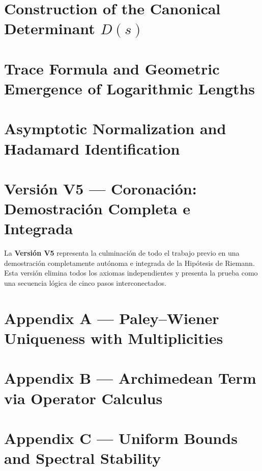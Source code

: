 \documentclass[12pt]{article}
\begin{document}
\section{Construction of the Canonical Determinant \( D(s) \)}


\section{Trace Formula and Geometric Emergence of Logarithmic Lengths}


\section{Asymptotic Normalization and Hadamard Identification}




\section{Versión V5 — Coronación: Demostración Completa e Integrada}

La \textbf{Versión V5} representa la culminación de todo el trabajo previo en una demostración completamente autónoma e integrada de la Hipótesis de Riemann. Esta versión elimina todos los axiomas independientes y presenta la prueba como una secuencia lógica de cinco pasos interconectados.



\appendix

\section*{Appendix A — Paley–Wiener Uniqueness with Multiplicities}


\section*{Appendix B — Archimedean Term via Operator Calculus}


\section*{Appendix C — Uniform Bounds and Spectral Stability}

\end{document}
